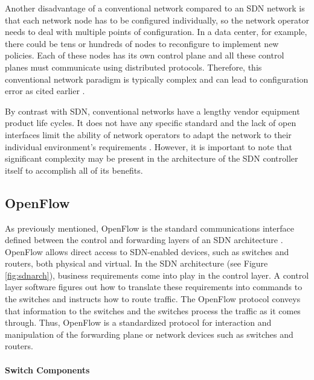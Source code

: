 Another disadvantage of a conventional network compared to an SDN network is that each network node has to be configured individually, so the network operator needs to deal with multiple points of configuration. In a data center, for example, there could be tens or hundreds of nodes to reconfigure to implement new policies. Each of these nodes has its own control plane and all these control planes must communicate using distributed protocols. Therefore, this conventional network paradigm is typically complex and can lead to configuration error as cited earlier \cite{6994333}. 

By contrast with SDN, conventional networks have a lengthy vendor equipment product life cycles. It does not have any specific standard and the lack of open interfaces limit the ability of network operators to adapt the network to their individual environment's requirements \cite{sdn-def}. However, it is important to note that significant complexity may be present in the architecture of the SDN controller itself to accomplish all of its benefits.

\subsection{OpenFlow}\label{sec:openflow}
As previously mentioned, OpenFlow is the standard communications interface defined between the control and forwarding layers of an SDN architecture \cite{openflow}. OpenFlow allows direct access to SDN-enabled devices, such as switches and routers, both physical and virtual. In the SDN architecture (see Figure \ref{fig:sdnarch}), business requirements come into play in the control layer. A control layer software figures out how to translate these requirements into commands to the switches and instructs how to route traffic. The OpenFlow protocol conveys that information to the switches and the switches process the traffic as it comes through. Thus, OpenFlow is a standardized protocol for interaction and manipulation of the forwarding plane or network devices such as switches and routers.

\paragraph{Switch Components}
